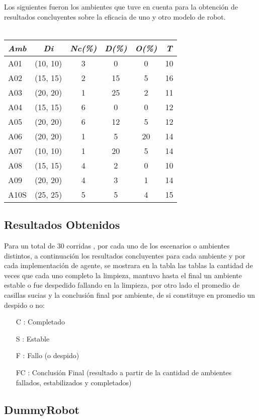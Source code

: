 \documentclass[a4paper,10pt,twocolumn]{article}
\begin{document}
Los siguientes fueron los ambientes que tuve en cuenta para la obtenci\'on de resultados concluyentes sobre la eficacia de uno y otro modelo de robot.
\\\\
\begin{tabular}{|l|c|c|c|c|c|}
	\hline
	\textit{Amb}  &\textit{Di}& \textit{Nc(\%)}& \textit{D(\%)}& \textit{O(\%)}& \textit{T}  \\ 
	\hline
	A01 & (10, 10) & 3 & 0 & 0 & 10 \\
	A02 & (15, 15) & 2 & 15 & 5 & 16 \\
	A03 & (20, 20) & 1 & 25 & 2 & 11 \\
	A04 & (15, 15) & 6 & 0 & 0 & 12 \\
	A05 & (20, 20) & 6 & 12 & 5 & 12 \\
	A06 & (20, 20) & 1 & 5 & 20 & 14 \\
	A07 & (10, 10) & 1 & 20 & 5 & 14 \\
	A08 & (15, 15) & 4 & 2 & 0 & 10 \\
	A09 & (20, 20) & 4 & 3 & 1 & 14 \\
	A10S & (25, 25) & 5 & 5 & 4 & 15 \\
	\hline
\end{tabular}


\subsection{Resultados Obtenidos}
Para un total de 30 corridas , por cada uno de los escenarios o ambientes distintos, a continuaci\'on los resultados concluyentes para cada ambiente y por cada implementaci\'on de agente, se mostrara en la tabla las tablas la cantidad de veces que cada uno completo la limpieza, mantuvo hasta el final un ambiente estable o fue despedido fallando en la limpieza, por otro lado el promedio de casillas sucias y la conclusi\'on final por ambiente, de si constituye en promedio un despido o no:

\begin{itemize}
	\item[C]: Completado
	\item[S]: Estable
	\item[F]: Fallo (o despido)
	\item[FC]: Conclusi\'on Final (resultado a partir de la cantidad de ambientes fallados, estabilizados y completados)
	
\end{itemize}


\subsection*{DummyRobot}
\end{document}

